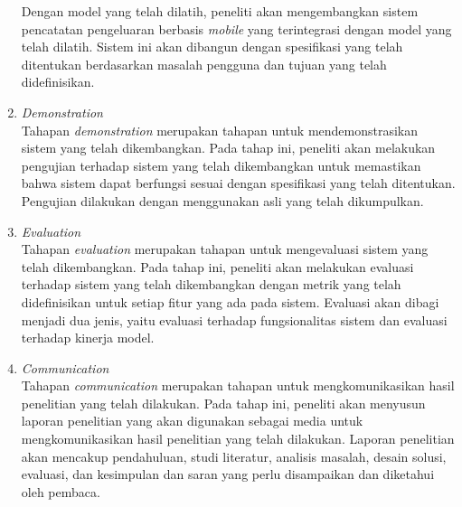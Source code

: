 \begin{enumerate}
		  Dengan model yang telah dilatih, peneliti akan mengembangkan sistem pencatatan pengeluaran berbasis \emph{mobile} yang terintegrasi dengan model \dl{} yang telah dilatih. Sistem ini akan dibangun dengan spesifikasi yang telah ditentukan berdasarkan masalah pengguna dan tujuan yang telah didefinisikan.
	\item \emph{Demonstration}~\\
	      Tahapan \emph{demonstration} merupakan tahapan untuk mendemonstrasikan sistem yang telah dikembangkan. Pada tahap ini, peneliti akan melakukan pengujian terhadap sistem yang telah dikembangkan untuk memastikan bahwa sistem dapat berfungsi sesuai dengan spesifikasi yang telah ditentukan. Pengujian dilakukan dengan menggunakan \dataset{} asli yang telah dikumpulkan.
	\item \emph{Evaluation}~\\
	      Tahapan \emph{evaluation} merupakan tahapan untuk mengevaluasi sistem yang telah dikembangkan. Pada tahap ini, peneliti akan melakukan evaluasi terhadap sistem yang telah dikembangkan dengan metrik yang telah didefinisikan untuk setiap fitur yang ada pada sistem. Evaluasi akan dibagi menjadi dua jenis, yaitu evaluasi terhadap fungsionalitas sistem dan evaluasi terhadap kinerja model. \newpage
\item \emph{Communication}~\\
	      Tahapan \emph{communication} merupakan tahapan untuk mengkomunikasikan hasil penelitian yang telah dilakukan. Pada tahap ini, peneliti akan menyusun laporan penelitian yang akan digunakan sebagai media untuk mengkomunikasikan hasil penelitian yang telah dilakukan. Laporan penelitian akan mencakup pendahuluan, studi literatur, analisis masalah, desain solusi, evaluasi, dan kesimpulan dan saran yang perlu disampaikan dan diketahui oleh pembaca.
\end{enumerate}
